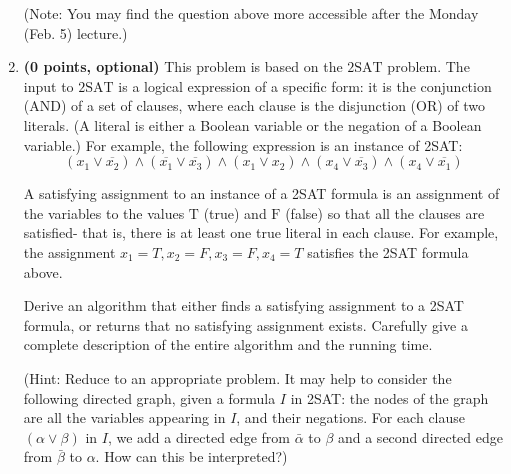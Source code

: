 \documentclass[11pt]{article}
\begin{document}
\begin{enumerate}
(Note: You may find the question above more accessible after the Monday (Feb. 5) lecture.)

\item {\bf (0 points, optional)} This problem is based on the $2 \mathrm{SAT}$ problem. The input to $2 \mathrm{SAT}$ is a logical expression of a specific form: it is the conjunction (AND) of a set of clauses, where each clause is the disjunction (OR) of two literals. (A literal is either a Boolean variable or the negation of a Boolean variable.) For example, the following expression is an instance of 2SAT:
$$
\left(x_1 \vee \overline{x_2}\right) \wedge\left(\overline{x_1} \vee \overline{x_3}\right) \wedge\left(x_1 \vee x_2\right) \wedge\left(x_4 \vee \overline{x_3}\right) \wedge\left(x_4 \vee \overline{x_1}\right)
$$

A satisfying assignment to an instance of a 2SAT formula is an assignment of the variables to the values $\mathrm{T}$ (true) and $\mathrm{F}$ (false) so that all the clauses are satisfied- that is, there is at least one true literal in each clause. For example, the assignment $x_1=T, x_2=F, x_3=F, x_4=T$ satisfies the 2SAT formula above.

Derive an algorithm that either finds a satisfying assignment to a 2SAT formula, or returns that no satisfying assignment exists. Carefully give a complete description of the entire algorithm and the running time.

(Hint: Reduce to an appropriate problem. It may help to consider the following directed graph, given a formula $I$ in 2SAT: the nodes of the graph are all the variables appearing in $I$, and their negations. For each clause $(\alpha \vee \beta)$ in $I$, we add a directed edge from $\bar{\alpha}$ to $\beta$ and a second directed edge from $\bar{\beta}$ to $\alpha$. How can this be interpreted?)


\end{enumerate}
\end{document}
